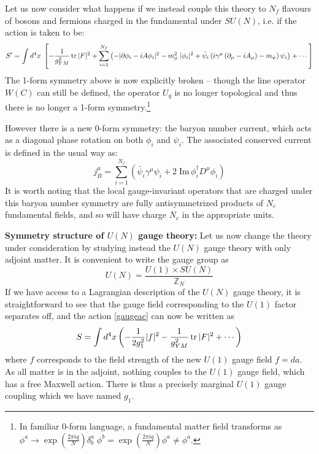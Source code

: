 \documentclass[aps,preprint,nofootinbib,preprintnumbers,eqsecnum,superscriptaddress]{revtex4}
\newcommand \tr {\mbox{{\bf Tr}}}
\def\tr{\mathop{\rm tr}}
\newcommand\p{\ensuremath{\partial}}
\newcommand\ga{{\ensuremath{{\gamma}}}}
\def\le{\left}
\def\ri{\right}
\renewcommand{\Im}{\textrm{Im}\,}
\begin{document}
Let us now consider what happens if we instead couple this theory to $N_f$ flavours of bosons and fermions charged in the fundamental under $SU(N)$, i.e. if the action is taken to be:
\begin{align}
S' = \int d^4x \; \left[- \frac{1}{ g_{YM}^2} \tr |F|^2 + \sum_{i = 1}^{N_f} \le(-|\p \phi_i - i A \phi_i|^2 - m_{\phi}^2 \; |\phi_i|^2 + \bar\psi_i \le(i \ga^{\mu} \le(\p_{\mu} - i A_{\mu} \ri)-m_{\psi}\ri)\psi_i\ri) + \cdots\right] \label{deformLag1} 
\end{align}
The 1-form symmetry above is now explicitly broken -- though the line operator $W(C)$ can still be defined, the operator $U_{q}$ is no longer topological and thus there is no longer a 1-form symmetry.\footnote{In familiar $0$-form language, a fundamental matter field transforms as \\
$\phi^a \to \exp\left(\frac{2 \pi i q}{N}\right) \delta^a_b \; \phi^b =  \exp\left(\frac{2 \pi i q}{N}\right) \phi^a \neq \phi^a$.}

However there is a new $0$-form symmetry: the baryon number current, which acts as a diagonal phase rotation on both $\phi_i$ and $\psi_i$. The associated conserved current is defined in the usual way as:
\begin{equation}
j^{\mu}_B = \sum_{i = 1}^{N_f} \le(\bar{\psi}_{i} \ga^{\mu} \psi_i + 2 \; \Im \phi_i^{\dagger} D^{\mu} \phi_i \ri) \label{baryonnum} 
\end{equation}
It is worth noting that the local gauge-invariant operators that are charged under this baryon number symmetry are fully antisymmetrized products of $N_c$ fundamental fields, and so will have charge $N_c$ in the appropriate units. 

{\bf Symmetry structure of $U(N)$ gauge theory:} 
Let us now change the theory under consideration by studying instead the $U(N)$ gauge theory with only adjoint matter. It is convenient to write the gauge group as
\begin{equation}
U(N) = \frac{U(1) \times SU(N)}{\mathbb{Z}_N}
\end{equation}
If we have access to a Lagrangian description of the $U(N)$ gauge theory, it is straightforward to see that the gauge field corresponding to the $U(1)$ factor separates off, and the action \eqref{gaugeac} can now be written as
\begin{equation}
S = \int d^4x \le(-\frac{1}{2 g_1^2} |f|^2 - \frac{1}{g_{YM}^2} \tr |F|^2 + \cdots \ri)  \label{freeEM} 
\end{equation}
where $f$ corresponds to the field strength of the new $U(1)$ gauge field $f = da$. As all matter is in the adjoint, nothing couples to the $U(1)$ gauge field, which has a free Maxwell action. There is thus a precisely marginal $U(1)$ gauge coupling which we have named $g_1$.
\end{document}
